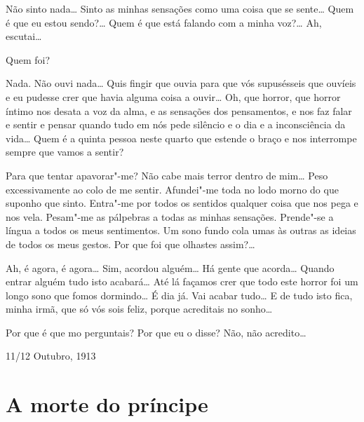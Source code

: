  Não sinto nada\ldots{} Sinto as
minhas sensações como uma coisa que
se sente\ldots{} Quem é que eu estou sendo?\ldots{} 
Quem é que está falando com a minha voz?\ldots{} 
Ah, escutai\ldots{}

 Quem foi?

 Nada. Não ouvi nada\ldots{} 
Quis fingir que ouvia para que vós
supusésseis que ouvíeis e eu pudesse crer 
que havia alguma coisa a ouvir\ldots{} 
Oh, que horror, que horror íntimo nos desata 
a voz da alma, e as sensações dos pensamentos, 
e nos faz falar e sentir e pensar quando
tudo em nós pede silêncio e o dia e a 
inconsciência da vida\ldots{} Quem é a
quinta pessoa neste quarto que estende o braço 
e nos interrompe sempre que vamos a sentir?

 Para que tentar apavorar"-me? 
Não cabe mais terror dentro de
mim\ldots{} 
Peso excessivamente ao colo de
me sentir. 
Afundei"-me toda no
lodo morno do que suponho que sinto. 
Entra"-me por todos os sentidos
qualquer coisa que nos pega e nos vela. 
Pesam"-me as pálpebras a todas as
minhas sensações. Prende"-se a língua a 
todos os meus sentimentos. Um
sono fundo cola umas às outras as ideias de 
todos os meus gestos. Por que foi que olhastes assim?\ldots{}

 
Ah, é agora, é agora\ldots{} Sim, acordou alguém\ldots{} 
Há gente que acorda\ldots{} Quando entrar
alguém tudo isto acabará\ldots{} Até lá façamos
crer que todo este horror
foi um longo sono que fomos dormindo\ldots{} 
É dia já. Vai acabar tudo\ldots{} E
de tudo isto fica, minha irmã, que só vós sois 
feliz, porque acreditais no sonho\ldots{}

 Por que é que mo perguntais? 
Por que eu o disse? Não, não acredito\ldots{}


\hfill 11/12 Outubro, 1913

\endgroup

\chapter{A morte do príncipe}

\begingroup
\linenumbers

